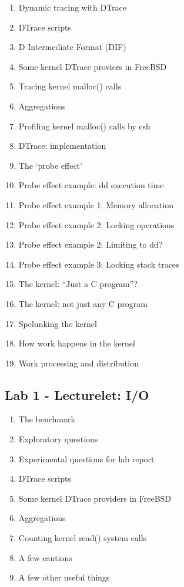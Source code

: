 \documentclass[a4paper,10pt]{article}
\begin{document}
\begin{enumerate}
  \item Dynamic tracing with DTrace
  \item DTrace scripts
  \item D Intermediate Format (DIF)
  \item Some kernel DTrace proviers in FreeBSD
  \item Tracing kernel malloc() calls
  \item Aggregations
  \item Profiling kernel malloc() calls by csh
  \item DTrace: implementation
  \item The `probe effect'
  \item Probe effect example: dd execution time
  \item Probe effect example 1: Memory allocation
  \item Probe effect example 2: Locking operations
  \item Probe effect example 2: Limiting to dd?
  \item Probe effect example 3: Locking stack traces
  \item The kernel: ``Just a C program''?
  \item The kernel: not just any C program
  \item Spelunking the kernel
  \item How work happens in the kernel
  \item Work processing and distribution
\end{enumerate}

\subsection*{Lab 1 - Lecturelet: I/O}

\begin{enumerate}
  \item The benchmark
  \item Exploratory questions
  \item Experimental questions for lab report
  \item DTrace scripts
  \item Some kernel DTrace providers in FreeBSD
  \item Aggregations
  \item Counting kernel read() system calls
  \item A few cautions
  \item A few other useful things
\end{enumerate}
\end{document}
